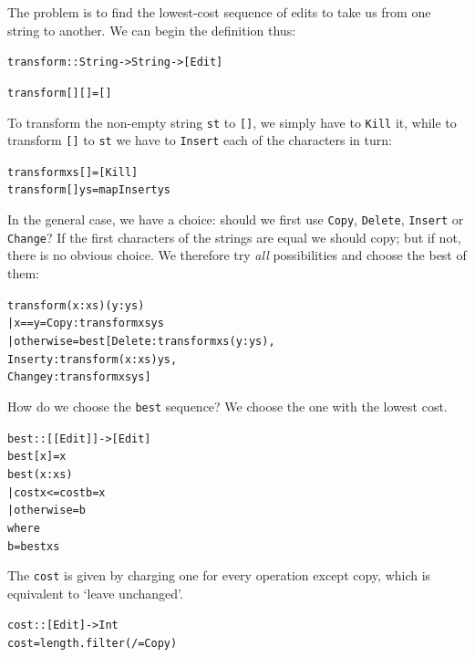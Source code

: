 The problem is to find the lowest-cost sequence of edits to take us from one
string to another. We can begin the definition thus:
\begin{alltt}
transform :: String -> String -> [Edit]

transform [] [] = []
\end{alltt}
To transform the non-empty string \texttt{st} to \texttt{[]}, we simply have to
\texttt{Kill} it, while to transform \texttt{[]} to \texttt{st} we have to 
\texttt{Insert} each of the characters in turn:
\begin{alltt}
transform xs [] = [Kill]
transform [] ys = map Insert ys
\end{alltt}
In the general case, we have a choice: should we first use \texttt{Copy}, 
\texttt{Delete}, \texttt{Insert} or \texttt{Change}? If the first characters of the
strings are equal we should copy; but if not, there is no obvious choice. We
therefore try {\em all\/} possibilities and choose the best of them:
\begin{alltt}
transform (x:xs) (y:ys)
  | x==y        = Copy : transform xs ys
  | otherwise   = best [ Delete   : transform xs (y:ys) ,
                         Insert y : transform (x:xs) ys ,
                         Change y : transform xs ys ]
\end{alltt}
How do we choose the \texttt{best} sequence? We choose the one with the lowest
cost.
\begin{alltt}
best :: [[Edit]] -> [Edit]
best [x]   = x
best (x:xs) 
  | cost x <= cost b    = x
  | otherwise           = b
      where 
      b = best xs
\end{alltt}
The \texttt{cost} is given by charging one for every operation except copy,
which is equivalent to `leave unchanged'.
\begin{alltt}
cost :: [Edit] -> Int
cost = length . filter (/=Copy)
\end{alltt}


